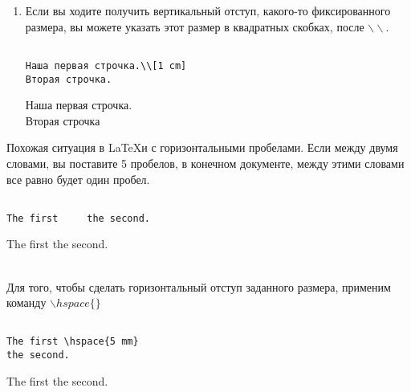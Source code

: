 \begin{enumerate}
    \item Если вы ходите получить вертикальный отступ, какого-то фиксированного размера,
    вы можете указать этот размер в квадратных скобках, после $\backslash \backslash$.

\begin{minipage}[h!]{0.5\linewidth}
\begin{verbatim}

Наша первая строчка.\\[1 cm]
Вторая строчка.

\end{verbatim}
\end{minipage}
\hfill
\begin{minipage}[h!]{0.5\linewidth}
Наша первая строчка.\\[1 cm]
Вторая строчка
\end{minipage}

    \end{enumerate}

    Похожая ситуация в \LaTeX и с горизонтальными пробелами.
    Если между двумя словами, вы поставите 5 пробелов, в конечном
    документе, между этими словами все равно будет один пробел.\\[0.5 cm]
    
\begin{minipage}[h!]{0.5\linewidth}
\begin{verbatim}

The first     the second.

\end{verbatim}
\end{minipage}
\hfill
\begin{minipage}[h!]{0.5\linewidth}
    The first     the second.
\end{minipage} \\[0.5 cm]

    Для того, чтобы сделать горизонтальный отступ заданного размера,
    применим команду $\backslash hspace\{\}$ \\[5 mm]

\begin{minipage}[h!]{0.5\linewidth}
\begin{verbatim}

The first \hspace{5 mm} 
the second.

\end{verbatim}
\end{minipage}
\hfill
\begin{minipage}[h!]{0.5\linewidth}
The first \hspace{5 mm} the second.
\end{minipage} \\[5 mm]


